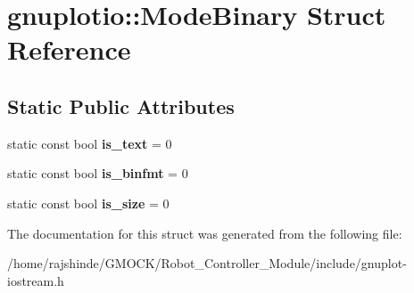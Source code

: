\hypertarget{structgnuplotio_1_1_mode_binary}{}\section{gnuplotio\+:\+:Mode\+Binary Struct Reference}
\label{structgnuplotio_1_1_mode_binary}
\subsection*{Static Public Attributes}
\begin{DoxyCompactItemize}
\item 
static const bool {\bfseries is\+\_\+text} = 0\hypertarget{structgnuplotio_1_1_mode_binary_ac89064b5df24f7ef4d765fdfde4fd1b6}{}\label{structgnuplotio_1_1_mode_binary_ac89064b5df24f7ef4d765fdfde4fd1b6}

\item 
static const bool {\bfseries is\+\_\+binfmt} = 0\hypertarget{structgnuplotio_1_1_mode_binary_aee724034dc3372b8e12b1187507bf136}{}\label{structgnuplotio_1_1_mode_binary_aee724034dc3372b8e12b1187507bf136}

\item 
static const bool {\bfseries is\+\_\+size} = 0\hypertarget{structgnuplotio_1_1_mode_binary_a6eae25ea662362bbb88bc987d6025290}{}\label{structgnuplotio_1_1_mode_binary_a6eae25ea662362bbb88bc987d6025290}

\end{DoxyCompactItemize}


The documentation for this struct was generated from the following file\+:\begin{DoxyCompactItemize}
\item 
/home/rajshinde/\+G\+M\+O\+C\+K/\+Robot\+\_\+\+Controller\+\_\+\+Module/include/gnuplot-\/iostream.\+h\end{DoxyCompactItemize}
